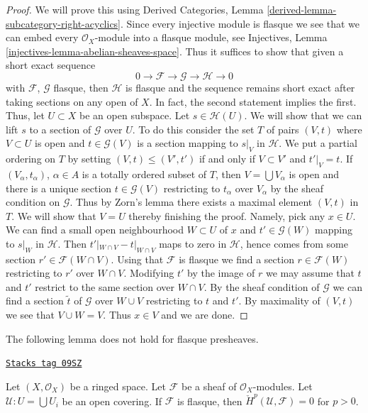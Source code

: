 \begin{proof}
We will prove this using
Derived Categories, Lemma \ref{derived-lemma-subcategory-right-acyclics}.
Since every injective module is flasque we see that we can embed
every $\mathcal{O}_X$-module into a flasque module, see
Injectives, Lemma \ref{injectives-lemma-abelian-sheaves-space}.
Thus it suffices to show that given a short exact sequence
$$
0 \to \mathcal{F} \to \mathcal{G} \to \mathcal{H} \to 0
$$
with $\mathcal{F}$, $\mathcal{G}$ flasque, then $\mathcal{H}$
is flasque and the sequence remains short exact after taking sections
on any open of $X$. In fact, the second statement implies the first.
Thus, let $U \subset X$ be an open subspace. Let $s \in \mathcal{H}(U)$.
We will show that we can lift $s$ to a section of $\mathcal{G}$
over $U$. To do this consider the set $T$ of pairs $(V, t)$
where $V \subset U$ is open and $t \in \mathcal{G}(V)$ is a section
mapping to $s|_V$ in $\mathcal{H}$.
We put a partial ordering on $T$ by setting
$(V, t) \leq (V', t')$ if and only if $V \subset V'$ and $t'|_V = t$.
If $(V_\alpha, t_\alpha)$, $\alpha \in A$
is a totally ordered subset of $T$, then $V = \bigcup V_\alpha$
is open and there is a unique section $t \in \mathcal{G}(V)$
restricting to $t_\alpha$ over $V_\alpha$ by the sheaf condition on
$\mathcal{G}$. Thus by Zorn's lemma there exists a maximal element
$(V, t)$ in $T$. We will show that $V = U$ thereby finishing the proof.
Namely, pick any $x \in U$. We can find a small open neighbourhood
$W \subset U$ of $x$ and $t' \in \mathcal{G}(W)$ mapping to $s|_W$
in $\mathcal{H}$. Then $t'|_{W \cap V} - t|_{W \cap V}$ maps to
zero in $\mathcal{H}$, hence comes from some section
$r' \in \mathcal{F}(W \cap V)$. Using that $\mathcal{F}$ is flasque
we find a section $r \in \mathcal{F}(W)$ restricting to $r'$
over $W \cap V$. Modifying $t'$ by the image of $r$ we may
assume that $t$ and $t'$ restrict to the same section over
$W \cap V$. By the sheaf condition of $\mathcal{G}$
we can find a section $\tilde t$ of $\mathcal{G}$ over
$W \cup V$ restricting to $t$ and $t'$.
By maximality of $(V, t)$ we see that $V \cup W = V$.
Thus $x \in V$ and we are done.
\end{proof}

The following lemma does not hold for flasque presheaves.

\begin{lemma}
\label{cohomology-lemma-flasque-acyclic-cech}
\href{https://stacks.math.columbia.edu/tag/09SZ}{\texttt{Stacks tag 09SZ}}

Let $(X, \mathcal{O}_X)$ be a ringed space.
Let $\mathcal{F}$ be a sheaf of $\mathcal{O}_X$-modules.
Let $\mathcal{U} : U = \bigcup U_i$ be an open covering.
If $\mathcal{F}$ is flasque, then
$\check{H}^p(\mathcal{U}, \mathcal{F}) = 0$ for $p > 0$.
\end{lemma}

